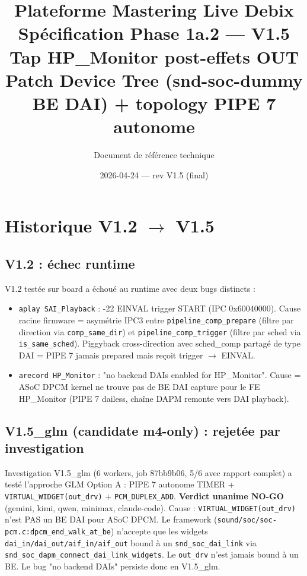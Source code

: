 \documentclass[11pt,a4paper]{article}
\title{\textbf{Plateforme Mastering Live Debix}\\[6pt]
  \Large Spécification Phase 1a.2 --- \textbf{V1.5}\\[4pt]
  \large Tap HP\_Monitor post-effets OUT\\
  \normalsize Patch Device Tree (snd-soc-dummy BE DAI) + topology PIPE 7 autonome}
\author{Document de référence technique}
\date{2026-04-24 --- rev V1.5 (final)}
\begin{document}
\maketitle
\tableofcontents
\clearpage

\section{Historique V1.2 $\to$ V1.5}

\subsection{V1.2 : échec runtime}

V1.2 testée sur board a échoué au runtime avec deux bugs distincts :
\begin{itemize}[leftmargin=*, itemsep=1pt]
  \item \texttt{aplay SAI\_Playback} : -22 EINVAL trigger START (IPC 0x60040000). Cause racine firmware = asymétrie IPC3 entre \texttt{pipeline\_comp\_prepare} (filtre par direction via \texttt{comp\_same\_dir}) et \texttt{pipeline\_comp\_trigger} (filtre par sched via \texttt{is\_same\_sched}). Piggyback cross-direction avec sched\_comp partagé de type DAI = PIPE 7 jamais prepared mais reçoit trigger $\to$ EINVAL.
  \item \texttt{arecord HP\_Monitor} : "no backend DAIs enabled for HP\_Monitor". Cause = ASoC DPCM kernel ne trouve pas de BE DAI capture pour le FE HP\_Monitor (PIPE 7 dailess, chaîne DAPM remonte vers DAI playback).
\end{itemize}

\subsection{V1.5\_glm (candidate m4-only) : rejetée par investigation}

Investigation V1.5\_glm (6 workers, job 87bb9b06, 5/6 avec rapport complet) a testé l'approche GLM Option A : PIPE 7 autonome TIMER + \texttt{VIRTUAL\_WIDGET(out\_drv)} + \texttt{PCM\_DUPLEX\_ADD}. \textbf{Verdict unanime NO-GO} (gemini, kimi, qwen, minimax, claude-code). Cause : \texttt{VIRTUAL\_WIDGET(out\_drv)} n'est PAS un BE DAI pour ASoC DPCM. Le framework (\texttt{sound/soc/soc-pcm.c:dpcm\_end\_walk\_at\_be}) n'accepte que les widgets \texttt{dai\_in/dai\_out/aif\_in/aif\_out} bound à un \texttt{snd\_soc\_dai\_link} via \texttt{snd\_soc\_dapm\_connect\_dai\_link\_widgets}. Le \texttt{out\_drv} n'est jamais bound à un BE. Le bug "no backend DAIs" persiste donc en V1.5\_glm.
\end{document}
